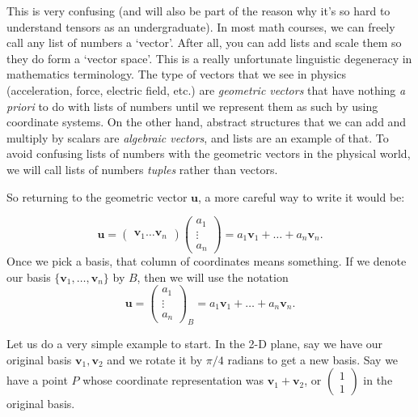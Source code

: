 \documentclass[../master.tex]{subfiles}
\begin{document}
	This is very confusing (and will also be part of the reason why it's so hard to understand tensors as an undergraduate). In most math courses, we can freely call any list of numbers a `vector'. After all, you can add lists and scale them so they do form a `vector space'. This is a really unfortunate linguistic degeneracy in mathematics terminology. The type of vectors that we see in physics (acceleration, force, electric field, etc.) are \emph{geometric vectors} that have nothing \emph{a priori} to do with lists of numbers until we represent them as such by using coordinate systems. On the other hand, abstract structures that we can add and multiply by scalars are \emph{algebraic vectors}, and lists are an example of that. To avoid confusing lists of numbers with the geometric vectors in the physical world, we will call lists of numbers \emph{tuples} rather than vectors.
	
	So returning to the geometric vector $\mathbf u$, a more careful way to write it would be:
	
	\begin{equation}\label{eq:RepU}
		\mathbf u = \begin{pmatrix}
			\mathbf v_1  \dots \mathbf v_n
		\end{pmatrix}\begin{pmatrix} a_1 \\ \vdots \\a_n	\end{pmatrix} = a_1 \mathbf v_1 + \dots + a_n \mathbf v_n.
	\end{equation}	
	Once we pick a basis, that column of coordinates means something. If we denote our basis $\{\mathbf v_1, \dots, \mathbf v_n \}$ by $B$, then we will use the notation 
	\begin{equation*}
		\mathbf u = \begin{pmatrix} a_1 \\ \vdots \\a_n	\end{pmatrix}_B = a_1 \mathbf v_1 + \dots + a_n \mathbf v_n.
	\end{equation*}
	
	
	Let us do a very simple example to start. In the 2-D plane, say we have our original basis $\mathbf v_1, \mathbf v_2$ and we rotate it by $\pi/4$ radians to get a new basis. Say we have a point $P$ whose coordinate representation was $\mathbf v_1 + \mathbf v_2$, or $\begin{pmatrix} 1 \\ 1 \end{pmatrix}$ in the original basis.
	
\end{document}
